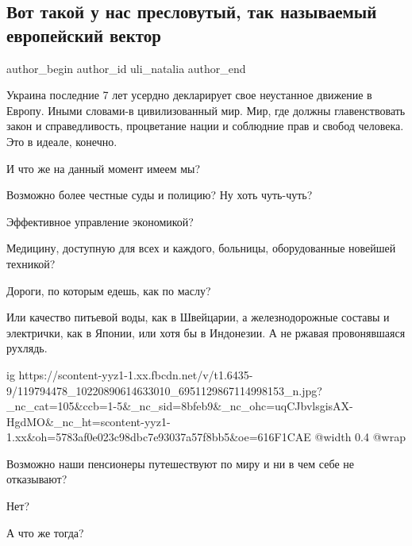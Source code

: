  
 
 
 
 
 
\subsection{Вот такой у нас пресловутый, так называемый европейский вектор}
\label{sec:18_09_2020.fb.uli_natalia.1.evro_vektor_ukraina}
 
\ifcmt
 author_begin
   author_id uli_natalia
 author_end
\fi

Украина последние 7 лет усердно декларирует свое неустанное движение в Европу.
Иными словами-в цивилизованный мир. Мир, где должны главенствовать закон и
справедливость, процветание нации и соблюдние прав и свобод человека. Это в
идеале, конечно.

И что же на данный момент имеем мы?

Возможно более честные суды и полицию? Ну хоть чуть-чуть?

Эффективное управление экономикой?

Медицину, доступную для всех и каждого, больницы, оборудованные новейшей
техникой?

Дороги, по которым едешь, как по маслу?

Или качество питьевой воды, как в Швейцарии, а железнодорожные составы и
электрички, как в Японии, или хотя бы в Индонезии. А не ржавая провонявшаяся
рухлядь.

\ifcmt
  ig https://scontent-yyz1-1.xx.fbcdn.net/v/t1.6435-9/119794478_10220890614633010_6951129867114998153_n.jpg?_nc_cat=105&ccb=1-5&_nc_sid=8bfeb9&_nc_ohc=uqCJbvlsgisAX-HgdMO&_nc_ht=scontent-yyz1-1.xx&oh=5783af0e023c98dbc7e93037a57f8bb5&oe=616F1CAE
  @width 0.4
  @wrap 
\fi

Возможно наши пенсионеры путешествуют по миру и ни в чем себе не отказывают?

Нет?

А что же  тогда?

